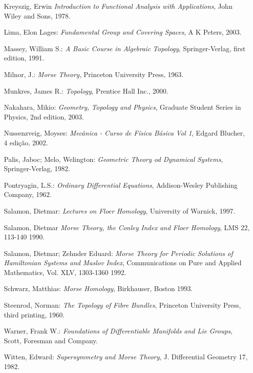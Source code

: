 \documentclass[12pt]{book}
\begin{document}
\begin{thebibliography}{9}
		Kreyszig, Erwin
		\emph{Introduction to Functional Analysis with Applications},
		John Wiley and Sons, 1978.
		
		
		Lima, Elon Lages:
		\emph{Fundamental Group and Covering Spaces},
		A K Peters, 2003.
		
		Massey, William S.:
		\emph{A Basic Course in Algebraic Topology},
		Springer-Verlag, first edition,
		1991.
		
		Milnor, J.:
		\emph{Morse Theory},
		Princeton University Press, 1963.

		Munkres, James R.:
		\emph{Topology},
		Prentice Hall Inc., 2000.
				
		Nakahara, Mikio:
		\emph{Geometry, Topology and Physics},
		Graduate Student Series in Physics, 2nd edition,
		2003.
		
		Nussenzveig, Moyses:
		\emph{Mecânica - Curso de Física Básica Vol 1},
		Edgard Blucher, 4 edição,
		2002.
		
		Palis, Jaboc; Melo, Welington:
		\emph{Geometric Theory od Dynamical Systems},
		Springer-Verlag,
		1982.
		
		Pontryagin, L.S.:
		\emph{Ordinary Differential Equations},
		Addison-Wesley Publishing Company,
		1962.
		
		Salamon, Dietmar:
		\emph{Lectures on Floer Homology},
		University of Warnick,
		1997.


		Salamon, Dietmar
		\emph{Morse Theory, the Conley Index and Floer Homology},
		LMS 22, 113-140
		1990.

		Salamon, Dietmar; Zehnder Eduard:
		\emph{Morse Theory for Periodic Solutions of Hamiltonian Systems and Maslov Index},
		Communications on Pure and Applied Mathematics, Vol. XLV, 1303-1360
		1992.
		
		Schwarz, Matthias:
		\emph{Morse Homology},
		Birkhauser, Boston
		1993.
		
		Steenrod, Norman:
		\emph{The Topology of Fibre Bundles},
		Princeton University Press, third printing, 
		1960.
		
		Warner, Frank W.:
		\emph{Foundations of Differentiable Manifolds and Lie Groups},
		Scott, Foresman and Company.
			
		Witten, Edward:
		\emph{Supersymmetry and Morse Theory},
		J. Differential Geometry 17,
		1982.
	\end{thebibliography}
	
\end{document}
